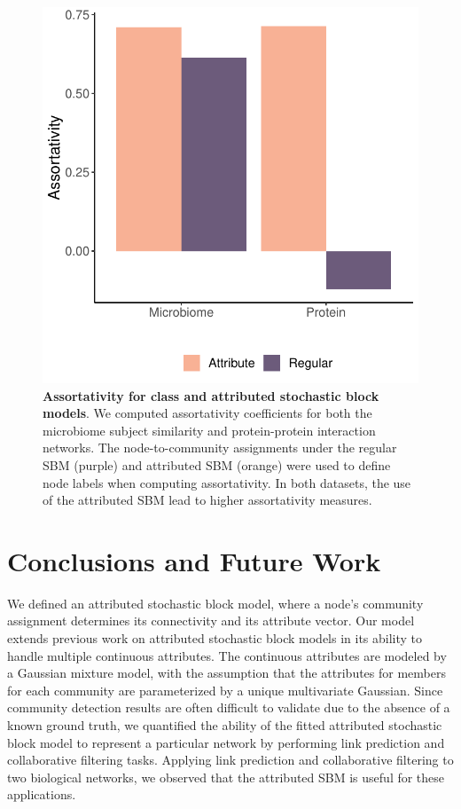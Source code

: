 \begin{figure}[h!]
\begin{center}
\includegraphics[width=.5\textwidth]{assort_fig.pdf}
\caption{{\bf Assortativity for class and attributed stochastic block models}. We computed assortativity coefficients for both the microbiome subject similarity and protein-protein interaction networks. The node-to-community assignments under the regular SBM (purple) and attributed SBM (orange) were used to define node labels when computing assortativity. In both datasets, the use of the attributed SBM lead to higher assortativity measures. }
\label{assortFig}
\end{center}
\end{figure}

\section{Conclusions and Future Work}
We defined an attributed stochastic block model, where a node's community assignment determines its connectivity and its attribute vector. Our model extends previous work on attributed stochastic block models in its ability to handle multiple continuous attributes. The continuous attributes are modeled by a Gaussian mixture model, with the assumption that the attributes for members for each community are parameterized by a unique multivariate Gaussian. Since community detection results are often difficult to validate due to the absence of a known ground truth, we quantified the ability of the fitted attributed stochastic block model to represent a particular network by performing link prediction and collaborative filtering tasks. Applying link prediction and collaborative filtering to two biological networks, we observed that the attributed SBM is useful for these applications.

